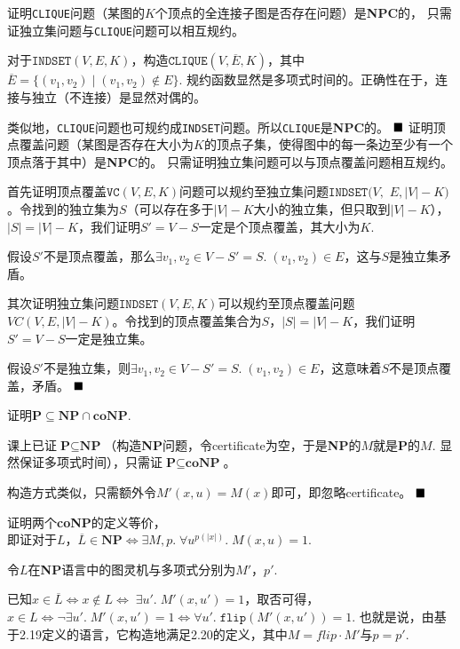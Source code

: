 \documentclass[11pt,largemargins]{homework}
\renewcommand{\qed}{$\hfill\blacksquare$}
\begin{document}
\begin{alphaparts}
  \questionpart 证明\texttt{CLIQUE}问题（某图的$K$个顶点的全连接子图是否存在问题）是\textbf{NPC}的，
  只需证独立集问题与\texttt{CLIQUE}问题可以相互规约。
  
  对于$\texttt{INDSET}(V,E,K)$，构造$\texttt{CLIQUE}(V,\overline{E},K)$，其中$\overline{E} = \{(v_1, v_2)\;|\; (v_1, v_2)\not\in E\}$. 规约函数显然是多项式时间的。正确性在于，连接与独立（不连接）是显然对偶的。
  
  类似地，\texttt{CLIQUE}问题也可规约成\texttt{INDSET}问题。所以\texttt{CLIQUE}是\textbf{NPC}的。
  \qed
  \questionpart 证明顶点覆盖问题（某图是否存在大小为$K$的顶点子集，使得图中的每一条边至少有一个顶点落于其中）是\textbf{NPC}的。
  只需证明独立集问题可以与顶点覆盖问题相互规约。

  首先证明顶点覆盖$\texttt{VC}(V,E,K)$问题可以规约至独立集问题$\texttt{INDSET}(V,$ $E,|V|-K)$。令找到的独立集为$S$（可以存在多于$|V|-K$大小的独立集，但只取到$|V|-K$），$|S| = |V|-K$，我们证明$S'= V-S$一定是个顶点覆盖，其大小为$K$. 

  假设$S'$不是顶点覆盖，那么$\exists v_1, v_2\in V-S' = S.\; (v_1, v_2)\in E$，这与$S$是独立集矛盾。

  其次证明独立集问题$\texttt{INDSET}(V,E,K)$可以规约至顶点覆盖问题$VC(V,E,|V|-K)$。令找到的顶点覆盖集合为$S$，$|S|=|V|-K$，我们证明$S' = V-S$一定是独立集。

  假设$S'$不是独立集，则$\exists v_1, v_2 \in V-S' = S.\; (v_1, v_2)\in E$，这意味着$S$不是顶点覆盖，矛盾。
  \qed
\end{alphaparts}

证明$\textbf{P}\subseteq \textbf{NP}\cap \textbf{coNP}$.

课上已证$\textbf{P}\subseteq \textbf{NP}$（构造\textbf{NP}问题，令certificate为空，于是\textbf{NP}的$M$就是\textbf{P}的$M$. 显然保证多项式时间），只需证$\textbf{P}\subseteq \textbf{coNP}$。

构造方式类似，只需额外令$M'(x, u) = M(x)$即可，即忽略certificate。
\qed 

证明两个\textbf{coNP}的定义等价，\\即证对于$L$，$\overline{L} \in \textbf{NP} \Leftrightarrow \exists M,p.\;\forall u^{p(|x|)}.\; M(x, u) = 1$.

令$L$在\textbf{NP}语言中的图灵机与多项式分别为$M'$，$p'$.

已知$x\in\overline{L} \Leftrightarrow x\not\in L \Leftrightarrow \;\exists u'.\; M'(x, u')=1 $，取否可得，$x\in L \Leftrightarrow \neg \exists u'.\; M'(x, u')=1 \Leftrightarrow \forall u'.\; \texttt{flip}(M'(x, u'))=1$. 也就是说，由基于2.19定义的语言，它构造地满足2.20的定义，其中$M = flip \cdot M'$与$p = p'$.
\end{document}
